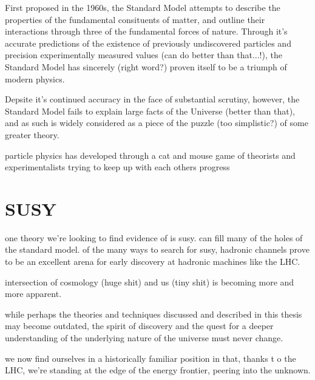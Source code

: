 First proposed in the 1960s, the Standard Model attempts to describe the
properties of the fundamental consituents of matter, and outline their
interactions through three of the fundamental forces of nature. Through it's
accurate predictions of the existence of previously undiscovered particles and
precision experimentally measured values (can do better than that...!), the
Standard Model has sincerely (right word?) proven itself to be a triumph of
modern physics.

Depsite it's continued accuracy in the face of substantial scrutiny, however,
the Standard Model fails to explain large facts of the Universe (better than
that), and as such is widely considered as a piece of the puzzle (too
simplistic?) of some greater theory. 


particle physics has developed through a cat and mouse game of theorists and
experimentalists trying to keep up with each others progress

\section{SUSY}
one theory we're looking to find evidence of is susy. can fill many of the holes
of the standard model.
of the many ways to search for susy, hadronic channels prove to be an excellent
arena for early discovery at hadronic machines like the LHC.

intersection of cosmology (huge shit) and us (tiny shit) is becoming more and
more apparent.

while perhaps the theories and techniques discussed and described in this thesis
may become outdated, the spirit of discovery and the quest for a deeper
understanding of the underlying nature of the universe must never change.

we now find ourselves in a historically familiar position in that, thanks t
o the LHC, we're standing
at the edge of the energy frontier, peering into the unknown.
